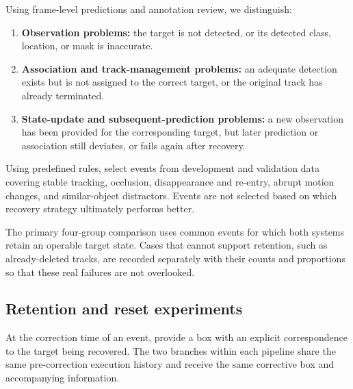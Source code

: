 \documentclass{article}
\begin{document}
Using frame-level predictions and annotation review, we distinguish:

\begin{enumerate}

\item \textbf{Observation problems:} the target is not detected, or its detected class, location, or mask is inaccurate.

\item \textbf{Association and track-management problems:} an adequate detection exists but is not assigned to the correct target, or the original track has already terminated.

\item \textbf{State-update and subsequent-prediction problems:} a new observation has been provided for the corresponding target, but later prediction or association still deviates, or fails again after recovery.

\end{enumerate}

Using predefined rules, select events from development and validation data covering stable tracking, occlusion, disappearance and re-entry, abrupt motion changes, and similar-object distractors. Events are not selected based on which recovery strategy ultimately performs better.

The primary four-group comparison uses common events for which both systems retain an operable target state. Cases that cannot support retention, such as already-deleted tracks, are recorded separately with their counts and proportions so that these real failures are not overlooked.

\subsection{Retention and reset experiments}

At the correction time of an event, provide a box with an explicit correspondence to the target being recovered. The two branches within each pipeline share the same pre-correction execution history and receive the same corrective box and accompanying information.
\end{document}
